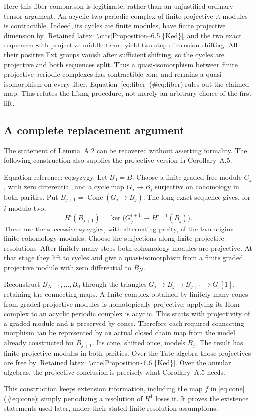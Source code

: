 \documentclass[10pt]{article}
\begin{document}
Here this fiber comparison is legitimate, rather than an unjustified ordinary-tensor argument. An acyclic two-periodic complex of finite projective \(A\)-modules is contractible. Indeed, its cycles are finite modules, have finite projective dimension by [Retained latex: \textbackslash{}cite[Proposition\textasciitilde{}6.5]\{Ked\}], and the two exact sequences with projective middle terms yield two-step dimension shifting. All their positive Ext groups vanish after sufficient shifting, so the cycles are projective and both sequences split. Thus a quasi-isomorphism between finite projective periodic complexes has contractible cone and remains a quasi-isomorphism on every fiber. Equation [eq:fiber] (\#eq:fiber) rules out the claimed map. This refutes the lifting procedure, not merely an arbitrary choice of the first lift.\par
\subsection*{A complete replacement argument}
The statement of Lemma A.2 can be recovered without asserting formality. The following construction also supplies the projective version in Corollary A.5.\par
Equation reference: eq:syzygy. Let \(B_0=B\). Choose a finite graded free module \(G_j\), with zero differential, and a cycle map \(G_j\to B_j\) surjective on cohomology in both parities. Put \(B_{j+1}=\operatorname{Cone}(G_j\to B_j)\). The long exact sequence gives, for \(i\) modulo two, \[H^i(B_{j+1})=
 \ker\bigl(G_j^{i+1}\longrightarrow H^{i+1}(B_j)\bigr).
 \] These are the successive syzygies, with alternating parity, of the two original finite cohomology modules. Choose the surjections along finite projective resolutions. After finitely many steps both cohomology modules are projective. At that stage they lift to cycles and give a quasi-isomorphism from a finite graded projective module with zero differential to \(B_N\).\par
Reconstruct \(B_{N-1},\ldots,B_0\) through the triangles \(G_j\to B_j\to B_{j+1}\to G_j[1]\), retaining the connecting maps. A finite complex obtained by finitely many cones from graded projective modules is homotopically projective: applying its Hom complex to an acyclic periodic complex is acyclic. This starts with projectivity of a graded module and is preserved by cones. Therefore each required connecting morphism can be represented by an actual closed chain map from the model already constructed for \(B_{j+1}\). Its cone, shifted once, models \(B_j\). The result has finite projective modules in both parities. Over the Tate algebra those projectives are free by [Retained latex: \textbackslash{}cite[Proposition\textasciitilde{}6.6]\{Ked\}]. Over the annular algebras, the projective conclusion is precisely what Corollary A.5 needs.\par
This construction keeps extension information, including the map \(f\) in [eq:cone] (\#eq:cone); simply periodizing a resolution of \(H^1\) loses it. It proves the existence statements used later, under their stated finite resolution assumptions.\par
\end{document}
